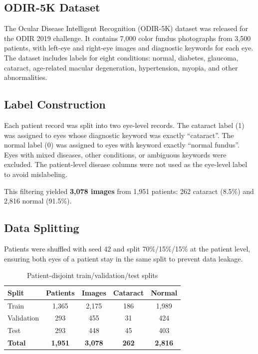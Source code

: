 \documentclass[12pt, a4paper]{article}
\begin{document}
\subsection{ODIR-5K Dataset}
The Ocular Disease Intelligent Recognition (ODIR-5K) dataset was released for the ODIR 2019 challenge. It contains 7,000 color fundus photographs from 3,500 patients, with left-eye and right-eye images and diagnostic keywords for each eye. The dataset includes labels for eight conditions: normal, diabetes, glaucoma, cataract, age-related macular degeneration, hypertension, myopia, and other abnormalities.

\subsection{Label Construction}
Each patient record was split into two eye-level records. The cataract label (1) was assigned to eyes whose diagnostic keyword was exactly ``cataract''. The normal label (0) was assigned to eyes with keyword exactly ``normal fundus''. Eyes with mixed diseases, other conditions, or ambiguous keywords were excluded. The patient-level disease columns were not used as the eye-level label to avoid mislabeling.

This filtering yielded \textbf{3,078 images} from 1,951 patients: 262 cataract (8.5\%) and 2,816 normal (91.5\%).

\subsection{Data Splitting}
Patients were shuffled with seed 42 and split 70\%/15\%/15\% at the patient level, ensuring both eyes of a patient stay in the same split to prevent data leakage.

\begin{table}[H]
\centering
\begin{tabular}{@{}lcccc@{}}
\toprule
\textbf{Split} & \textbf{Patients} & \textbf{Images} & \textbf{Cataract} & \textbf{Normal} \\
\midrule
Train & 1,365 & 2,175 & 186 & 1,989 \\
Validation & 293 & 455 & 31 & 424 \\
Test & 293 & 448 & 45 & 403 \\
\midrule
\textbf{Total} & \textbf{1,951} & \textbf{3,078} & \textbf{262} & \textbf{2,816} \\
\bottomrule
\end{tabular}
\caption{Patient-disjoint train/validation/test splits}
\end{table}
\end{document}
